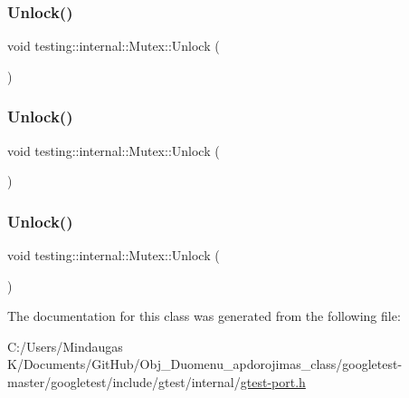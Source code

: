 \mbox{\label{classtesting_1_1internal_1_1_mutex_a315188055de1be98884519ad84eff2e6}} 
\subsubsection{\texorpdfstring{Unlock()}{Unlock()}\hspace{0.1cm}{\footnotesize\ttfamily [1/3]}}
{\footnotesize\ttfamily void testing\+::internal\+::\+Mutex\+::\+Unlock (\begin{DoxyParamCaption}{ }\end{DoxyParamCaption})\hspace{0.3cm}{\ttfamily [inline]}}

\mbox{\label{classtesting_1_1internal_1_1_mutex_a315188055de1be98884519ad84eff2e6}} 
\subsubsection{\texorpdfstring{Unlock()}{Unlock()}\hspace{0.1cm}{\footnotesize\ttfamily [2/3]}}
{\footnotesize\ttfamily void testing\+::internal\+::\+Mutex\+::\+Unlock (\begin{DoxyParamCaption}{ }\end{DoxyParamCaption})\hspace{0.3cm}{\ttfamily [inline]}}

\mbox{\label{classtesting_1_1internal_1_1_mutex_a315188055de1be98884519ad84eff2e6}} 
\subsubsection{\texorpdfstring{Unlock()}{Unlock()}\hspace{0.1cm}{\footnotesize\ttfamily [3/3]}}
{\footnotesize\ttfamily void testing\+::internal\+::\+Mutex\+::\+Unlock (\begin{DoxyParamCaption}{ }\end{DoxyParamCaption})\hspace{0.3cm}{\ttfamily [inline]}}



The documentation for this class was generated from the following file\+:\begin{DoxyCompactItemize}
\item 
C\+:/\+Users/\+Mindaugas K/\+Documents/\+Git\+Hub/\+Obj\+\_\+\+Duomenu\+\_\+apdorojimas\+\_\+class/googletest-\/master/googletest/include/gtest/internal/\mbox{\hyperlink{googletest-master_2googletest_2include_2gtest_2internal_2gtest-port_8h}{gtest-\/port.\+h}}\end{DoxyCompactItemize}
